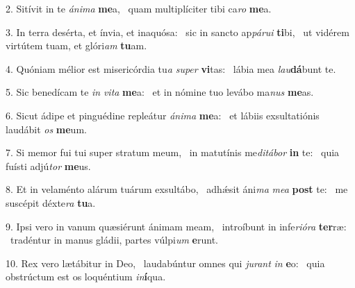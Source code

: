 2. Sitívit in te \textit{á}\textit{ni}\textit{ma} \textbf{me}a, \ast\  quam multiplíciter tibi ca\textit{ro} \textbf{me}a.\

3. In terra desérta, et ínvia, et inaquósa: \dag\  sic in sancto ap\textit{pá}\textit{ru}\textit{i} \textbf{ti}bi, \ast\  ut vidérem virtútem tuam, et glóri\textit{am} \textbf{tu}am.\

4. Quóniam mélior est misericórdia tu\textit{a} \textit{su}\textit{per} \textbf{vi}tas: \ast\  lábia mea \textit{lau}\textbf{dá}bunt te.\

5. Sic benedícam te \textit{in} \textit{vi}\textit{ta} \textbf{me}a: \ast\  et in nómine tuo levábo ma\textit{nus} \textbf{me}as.\

6. Sicut ádipe et pinguédine repleátur \textit{á}\textit{ni}\textit{ma} \textbf{me}a: \ast\  et lábiis exsultatiónis laudábit \textit{os} \textbf{me}um.\

7. Si memor fui tui super stratum meum, \dag\  in matutínis me\textit{di}\textit{tá}\textit{bor} \textbf{in} te: \ast\  quia fuísti adjú\textit{tor} \textbf{me}us.\

8. Et in velaménto alárum tuárum exsultábo, \dag\  adhǽsit áni\textit{ma} \textit{me}\textit{a} \textbf{post} te: \ast\  me suscépit déxte\textit{ra} \textbf{tu}a.\

9. Ipsi vero in vanum quæsiérunt ánimam meam, \dag\  introíbunt in infe\textit{ri}\textit{ó}\textit{ra} \textbf{ter}ræ: \ast\  tradéntur in manus gládii, partes vúlpi\textit{um} \textbf{e}runt.\

10. Rex vero lætábitur in Deo, \dag\  laudabúntur omnes qui \textit{ju}\textit{rant} \textit{in} \textbf{e}o: \ast\  quia obstrúctum est os loquéntium \textit{in}\textbf{í}qua.\

